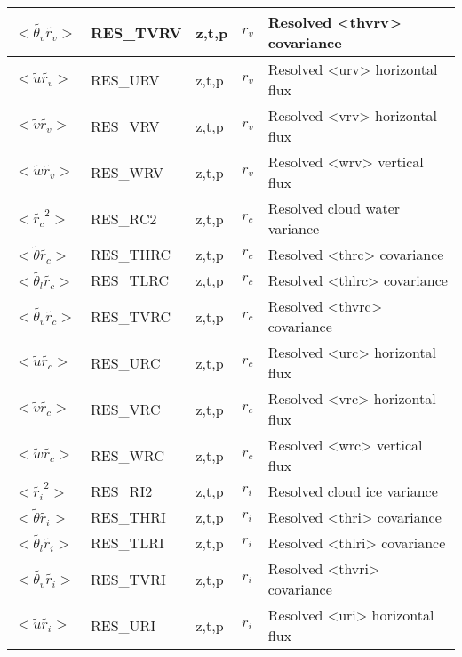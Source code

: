 \begin{longtable}[c]{|p{}|p{}|p{}|p{}|p{}|}
$<\tilde{\theta_v}\tilde{r_v}>$                      & RES\_TVRV  & z,t,p   & $r_v$ & Resolved <thvrv> covariance \\\hline
$<\tilde{u}\tilde{r_v}>$                             & RES\_URV   & z,t,p   & $r_v$ & Resolved <urv> horizontal flux \\\hline
$<\tilde{v}\tilde{r_v}>$                             & RES\_VRV   & z,t,p   & $r_v$ & Resolved <vrv> horizontal flux \\\hline
$<\tilde{w}\tilde{r_v}>$                             & RES\_WRV   & z,t,p   & $r_v$ & Resolved <wrv> vertical flux \\\hline
$<\tilde{r_c}^2>$                                    & RES\_RC2   & z,t,p   & $r_c$ & Resolved cloud water variance \\\hline
$<\tilde{\theta}\tilde{r_c}>$                        & RES\_THRC  & z,t,p   & $r_c$ & Resolved <thrc> covariance \\\hline
$<\tilde{\theta_l}\tilde{r_c}>$                      & RES\_TLRC  & z,t,p   & $r_c$ & Resolved <thlrc> covariance \\\hline
$<\tilde{\theta_v}\tilde{r_c}>$                      & RES\_TVRC  & z,t,p   & $r_c$ & Resolved <thvrc> covariance \\\hline
$<\tilde{u}\tilde{r_c}>$                             & RES\_URC   & z,t,p   & $r_c$ & Resolved <urc> horizontal flux \\\hline
$<\tilde{v}\tilde{r_c}>$                             & RES\_VRC   & z,t,p   & $r_c$ & Resolved <vrc> horizontal flux \\\hline
$<\tilde{w}\tilde{r_c}>$                             & RES\_WRC   & z,t,p   & $r_c$ & Resolved <wrc> vertical flux \\\hline
$<\tilde{r_i}^2>$                                    & RES\_RI2   & z,t,p   & $r_i$ & Resolved cloud ice variance \\\hline
$<\tilde{\theta}\tilde{r_i}>$                        & RES\_THRI  & z,t,p   & $r_i$ & Resolved <thri> covariance \\\hline
$<\tilde{\theta_l}\tilde{r_i}>$                      & RES\_TLRI  & z,t,p   & $r_i$ & Resolved <thlri> covariance \\\hline
$<\tilde{\theta_v}\tilde{r_i}>$                      & RES\_TVRI  & z,t,p   & $r_i$ & Resolved <thvri> covariance \\\hline
$<\tilde{u}\tilde{r_i}>$                             & RES\_URI   & z,t,p   & $r_i$ & Resolved <uri> horizontal flux \\\hline

\end{longtable}
